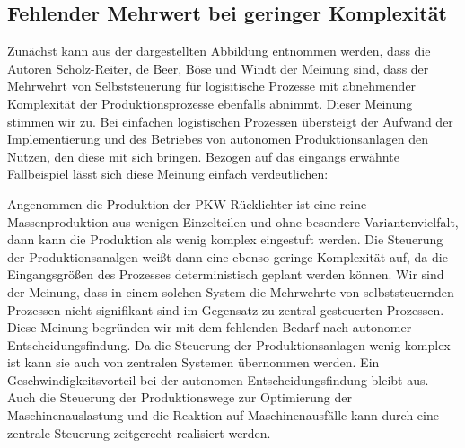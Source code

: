 \subsection{Fehlender Mehrwert bei geringer Komplexität}
\label{sec:GrenzenKomplexitaet}

Zunächst kann aus der dargestellten Abbildung entnommen werden, dass die Autoren Scholz-Reiter, de Beer, Böse und Windt der 
Meinung sind, dass der Mehrwehrt von Selbststeuerung für logisitische Prozesse mit abnehmender Komplexität der 
Produktionsprozesse ebenfalls abnimmt. Dieser Meinung stimmen wir zu. Bei einfachen logistischen Prozessen übersteigt der 
Aufwand der Implementierung und des Betriebes von autonomen Produktionsanlagen den Nutzen, den diese mit sich bringen. 
Bezogen auf das eingangs erwähnte Fallbeispiel lässt sich diese Meinung einfach verdeutlichen: 

Angenommen die Produktion der PKW-Rücklichter ist eine reine Massenproduktion aus wenigen Einzelteilen und ohne besondere 
Variantenvielfalt, dann kann die Produktion als wenig komplex eingestuft werden. Die Steuerung der Produktionsanalgen 
weißt dann eine ebenso geringe Komplexität auf, da die Eingangsgrößen des Prozesses deterministisch geplant werden können. 
Wir sind der Meinung, dass in einem solchen System die Mehrwehrte von selbststeuernden Prozessen nicht signifikant sind im 
Gegensatz zu zentral gesteuerten Prozessen. 
Diese Meinung begründen wir mit dem fehlenden Bedarf nach autonomer Entscheidungsfindung.
Da die Steuerung der Produktionsanlagen wenig komplex ist kann sie auch von zentralen Systemen übernommen werden. Ein 
Geschwindigkeitsvorteil bei der autonomen Entscheidungsfindung bleibt aus. Auch die Steuerung der Produktionswege zur 
Optimierung der Maschinenauslastung und die Reaktion auf Maschinenausfälle kann durch eine zentrale Steuerung zeitgerecht 
realisiert werden.
